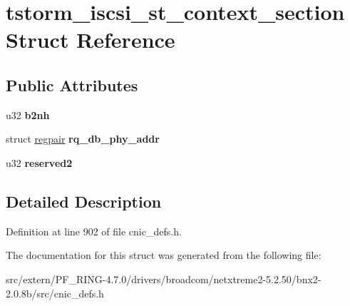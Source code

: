 \hypertarget{structtstorm__iscsi__st__context__section}{
\section{tstorm\_\-iscsi\_\-st\_\-context\_\-section Struct Reference}
\label{structtstorm__iscsi__st__context__section}
}
\subsection*{Public Attributes}
\begin{DoxyCompactItemize}
\item 
\hypertarget{structtstorm__iscsi__st__context__section_a8ceebdfb78bca06419c2ec783d85ce7b}{
u32 {\bfseries b2nh}}
\label{structtstorm__iscsi__st__context__section_a8ceebdfb78bca06419c2ec783d85ce7b}

\item 
\hypertarget{structtstorm__iscsi__st__context__section_a0a5e7ed72ffccca16b026ddaf3606df4}{
struct \hyperlink{structregpair}{regpair} {\bfseries rq\_\-db\_\-phy\_\-addr}}
\label{structtstorm__iscsi__st__context__section_a0a5e7ed72ffccca16b026ddaf3606df4}

\item 
\hypertarget{structtstorm__iscsi__st__context__section_a6e6c7068279c6622a24301f5b0306742}{
u32 {\bfseries reserved2}}
\label{structtstorm__iscsi__st__context__section_a6e6c7068279c6622a24301f5b0306742}

\end{DoxyCompactItemize}


\subsection{Detailed Description}


Definition at line 902 of file cnic\_\-defs.h.



The documentation for this struct was generated from the following file:\begin{DoxyCompactItemize}
\item 
src/extern/PF\_\-RING-\/4.7.0/drivers/broadcom/netxtreme2-\/5.2.50/bnx2-\/2.0.8b/src/cnic\_\-defs.h\end{DoxyCompactItemize}
